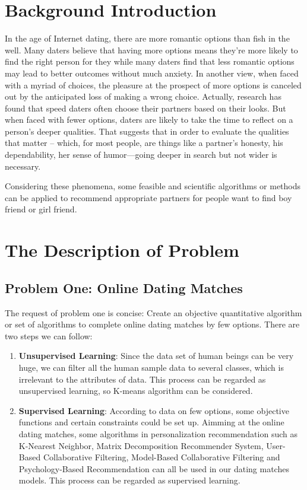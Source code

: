 \section{Background Introduction}
In the age of Internet dating, there are more romantic options than fish in the well. Many daters believe that having more options means they're more likely to find the right person for they while many daters find that less romantic options may lead to better outcomes without much anxiety. In another view, when faced with a myriad of choices, the pleasure at the prospect of more options is canceled out by the anticipated loss of making a wrong choice.  Actually, research has found that speed daters often choose their partners based on their looks. But when faced with fewer options, daters are likely to take the time to reflect on a person's deeper qualities. That suggests that in order to evaluate the qualities that matter -- which, for most people, are things like a partner’s honesty, his dependability, her sense of humor—going deeper in search but not wider is necessary.\par
Considering these phenomena, some feasible and scientific algorithms or methods can be applied to recommend appropriate partners for people want to find boy friend or girl friend.

\section{The Description of Problem}   
\subsection{Problem One: Online Dating Matches  }  
The request of problem one is concise: Create an objective quantitative algorithm or set of algorithms to complete online dating matches by few options. There are two steps we can follow:

\begin{enumerate}
	\item \textbf{Unsupervised Learning}: Since the data set of human beings can be very huge, we can filter all the human sample data to several classes, which is irrelevant to the attributes of data. This process can be regarded as unsupervised learning, so K-means algorithm can be considered. 
	\item \textbf{Supervised Learning}: According to data on few options, some objective functions and certain constraints could be set up. Aimming at the online dating matches, some algorithms in personalization recommendation such as K-Nearest Neighbor, Matrix Decomposition Recommender System, User-Based Collaborative Filtering, Model-Based Collaborative Filtering and Psychology-Based Recommendation can all be used in our dating matches models. This process can be regarded as supervised learning.
\end{enumerate}

